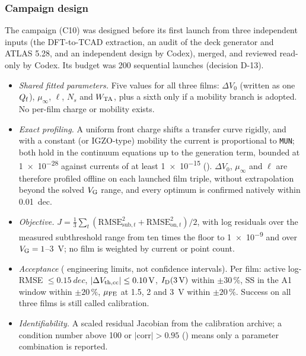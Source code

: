 \subsubsection{Campaign design}
\label{sec:m-tcad-campaign}

The campaign (C10) was designed before its first launch from three independent inputs (the DFT-to-TCAD extraction, an
audit of the deck generator and ATLAS 5.28, and an independent design by Codex), merged, and reviewed read-only by
Codex. %
Its budget was 200 sequential launches (decision D-13). %
\begin{itemize}
\item \emph{Shared fitted parameters.} Five values for all three films: $\Delta V_0$ (written as one $Q_{\mathrm{f}}$), $\mu_\infty$,
$\ell$, $N_s$ and $W_{\mathrm{TA}}$, plus a sixth only if a mobility branch is adopted. No per-film charge or mobility exists. %
\item \emph{Exact profiling.} A uniform front charge shifts a transfer curve rigidly, and with a constant (or
IGZO-type) mobility the current is proportional to \texttt{MUN}; both hold in the continuum equations up to the
generation term, bounded at \SI{1e-28}{\Aum} against currents of at least \SI{1e-15}{\Aum} (). %
$\Delta V_0$, $\mu_\infty$ and $\ell$ are
therefore profiled offline on each launched film triple, without extrapolation beyond the solved $V_{\mathrm{G}}$ range, and every
optimum is confirmed natively within \SI{0.01}{dec}. %
\item \emph{Objective.} $J = \tfrac13\sum_t (\mathrm{RMSE}^2_{\mathrm{sub},t} + \mathrm{RMSE}^2_{\mathrm{on},t})/2$,
with log residuals over the measured subthreshold range from ten times the floor to \SI{1e-9}{\Aum} and over
$V_{\mathrm{G}} = 1$--3~V; no film is weighted by current or point count. %
\item \emph{Acceptance} ( engineering limits, not confidence intervals). Per film: active log-RMSE
$\le \SI{0.15}{dec}$, $|\Delta V_{\mathrm{th,cc}}| \le \SI{0.10}{V}$, $I_{\mathrm{D}}(3\,\mathrm{V})$ within $\pm30\,\%$, SS in the A1 window
within $\pm20\,\%$, $\mu_{\mathrm{FE}}$ at 1.5, 2 and 3~V within $\pm20\,\%$. Success on all three films is still called
calibration. %
\item \emph{Identifiability.} A scaled residual Jacobian from the calibration archive; a condition number above 100 or
$|\mathrm{corr}| > 0.95$ () means only a parameter combination is reported. %

\end{itemize}
